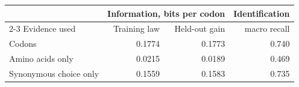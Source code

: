 \begin{tabular}{@{}p{4.2cm} r r r@{}}
\toprule
 & \multicolumn{2}{c}{Information, bits per codon} & Identification \\
\cmidrule(lr){2-3}
Evidence used & Training law & Held-out gain & macro recall \\
\midrule
Codons & 0.1774 & 0.1773 & 0.740 \\
Amino acids only & 0.0215 & 0.0189 & 0.469 \\
Synonymous choice only & 0.1559 & 0.1583 & 0.735 \\
\bottomrule
\end{tabular}